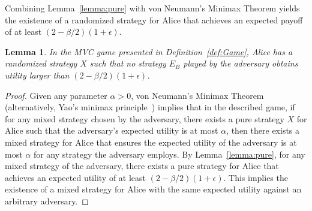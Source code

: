 \documentclass[11pt]{article}
\newtheorem{lemma}[theorem]{Lemma}
\begin{document}
Combining Lemma~\ref{lemma:pure} with von Neumann's Minimax Theorem yields
the existence of a randomized strategy for Alice that achieves an
expected payoff of at least $(2-\beta/2)(1+\epsilon)$.


\begin{lemma} \label{lemma:mixed}
In the MVC game presented in  Definition~\ref{def:Game}, Alice has a randomized strategy $X$ such that no strategy $E_B$ played by the adversary obtains utility larger than $(2-\beta/2)(1+\epsilon)$.
\end{lemma}

\begin{proof}
Given any parameter $\alpha > 0$, von Neumann's Minimax Theorem~\cite{vonNeumann:1928:TGG} (alternatively, Yao's minimax principle~\cite{DBLP:conf/focs/Yao77}) implies that in the described game, if for any mixed
strategy chosen by the adversary, there exists a pure strategy \( X \)
for Alice such that the adversary's expected utility is at most
$\alpha$, then there exists a mixed strategy for Alice that ensures
the expected utility of the adversary is at most $\alpha$ for any
strategy the adversary employs.  By Lemma~\ref{lemma:pure}, for any
mixed strategy of the adversary, there exists a pure strategy for
Alice that achieves an expected utility of at least
$(2-\beta/2)(1+\epsilon)$.  This implies the existence of a mixed
strategy for Alice with the same expected utility against an arbitrary
adversary.
\end{proof}

 
\end{document}
